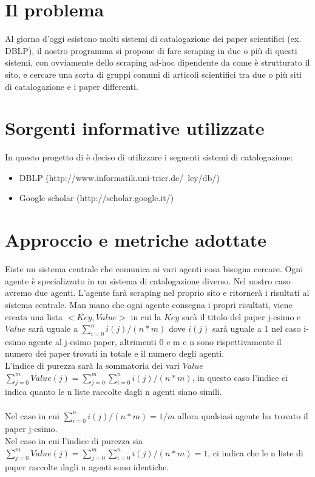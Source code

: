 \documentclass[12pt]{article}
\begin{document}
\maketitle

\section{Il problema}
Al giorno d'oggi esistono molti sistemi di catalogazione dei paper scientifici (ex. DBLP), il nostro programma si propone di fare scraping in due o più di questi sistemi, con ovviamente dello scraping ad-hoc dipendente da come è strutturato il sito, e cercare una sorta di gruppi comuni di articoli scientifici tra due o più siti di catalogazione e i paper differenti.

\section{Sorgenti informative utilizzate}
In questo progetto di è deciso di utilizzare i seguenti sistemi di catalogazione:
\begin{itemize}
\item DBLP (http://www.informatik.uni-trier.de/~ley/db/)
\item Google scholar (http://scholar.google.it/)
\end{itemize}

\section{Approccio e metriche adottate}
Eiste un sistema centrale che comunica ai vari agenti cosa bisogna cercare. Ogni agente è specializzato in un sistema di catalogazione diverso. Nel nostro caso avremo due agenti. L'agente far\`a scraping nel proprio sito e ritornerà i risultati al sistema centrale. Man mano che ogni agente consegna i propri risultati, viene creata una lista $<Key, Value>$ in cui la $Key$ sar\`a il titolo del paper j-esimo e $Value$ sar\`a uguale a $\displaystyle\sum\limits_{i=0}^n i(j)/(n*m)$ dove $i(j)$ sar\`a uguale a 1 nel caso i-esimo agente al j-esimo paper, altrimenti 0 e m e n sono rispettivamente il numero dei paper trovati in totale e il numero degli agenti.\\
L'indice di purezza sar\`a la sommatoria dei vari $Value$ $\displaystyle\sum\limits_{j=0}^m Value(j) = \displaystyle\sum\limits_{j=0}^m \displaystyle\sum\limits_{i=0}^n i(j)/(n*m)$, in questo caso l'indice ci indica quanto le n liste raccolte dagli n agenti siano simili. \\\\
Nel caso in cui $\displaystyle\sum\limits_{i=0}^n i(j)/(n*m) = 1/m$ allora qualsiasi agente ha trovato il paper j-esimo.\\
Nel caso in cui l'indice di purezza sia $\displaystyle\sum\limits_{j=0}^m Value(j) = \displaystyle\sum\limits_{j=0}^m \displaystyle\sum\limits_{i=0}^n i(j)/(n*m) = 1$, ci indica che le n liste di paper raccolte dagli n agenti sono identiche.\\
\end{document}

